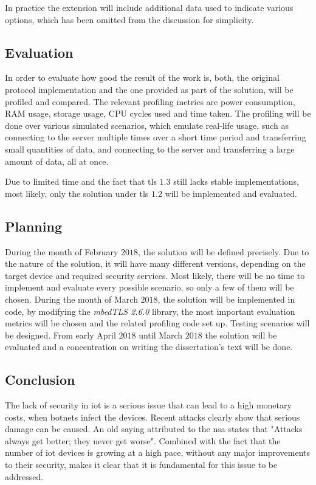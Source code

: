 \documentclass{llncs}
\begin{document}
In practice the extension will include additional data used to indicate various options, which has been omitted from the discussion for simplicity.

\subsection{Evaluation}

In order to evaluate how good the result of the work is, both, the original protocol
implementation and the one provided as part of the solution, will be profiled and compared. The relevant profiling metrics are power consumption, RAM usage, storage usage,
CPU cycles used and time taken. The profiling
will be done over various simulated scenarios, which emulate real-life usage,
such as connecting to the server multiple times over a short time period and transferring
small quantities of data, and connecting to the server and transferring a large
amount of data, all at once.

Due to limited time and the fact that \gls{tls} $1.3$ still lacks stable implementations, most likely, only the solution under \gls{tls} $1.2$ will be implemented and evaluated.

\subsection{Planning}

During the month of February $2018$, the solution will be defined precisely.
Due to the nature of the solution, it will have many different versions, depending
on the target device and required security services. Most likely, there will be no time
to implement and evaluate every possible scenario, so only a few of them will be chosen.
During the month of March $2018$, the solution will be implemented in code, by modifying
the \textit{mbedTLS 2.6.0} library\cite{SSLLibra13:online}, the most important evaluation metrics will be chosen and the related profiling code set up. Testing scenarios will be designed.
From early April $2018$ until March $2018$ the solution will be evaluated and a concentration on writing the dissertation's text will be done.

\subsection{Conclusion}

The lack of security in \gls{iot} is a serious issue that can lead to a high monetary costs,
when botnets infect the devices. Recent
attacks clearly show that serious damage can be caused. An old saying attributed to the
\gls{nsa} states that "Attacks always get better; they never get worse".
Combined with the fact that the number of \gls{iot} devices is growing at a high
pace, without any major improvements to their security, makes it clear
that it is fundamental for this issue to be addressed.
\end{document}

